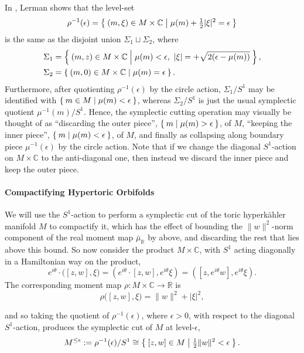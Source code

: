 \documentclass{amsart}
\newcommand{\ra}{\rightarrow}
\newcommand{\e}{\epsilon}
\newcommand{\RR}{\mathbb{R}}
\newcommand{\CC}{\mathbb{C}}
\begin{document}
	In \cite{Ler95}, Lerman shows that the level-set
	\[
		\rho^{-1}(\e) = \Set{(m, \xi) \in M \times \CC | \mu(m) + \tfrac{1}{2}|\xi|^{2} = \e}
	\]
	is the same as the disjoint union $\Sigma_{1} \sqcup \Sigma_{2}$, where
	\begin{align*}
		\Sigma_{1} &= \Set{(m,z) \in M \times \CC | \mu(m) < \e,\ |\xi| = + \sqrt{2(\e - \mu(m))} }, \\
		\Sigma_{2} &= \Set{(m,0) \in M \times \CC | \mu(m) = \e}.
	\end{align*}
	Furthermore, after quotienting $\rho^{-1}(\e)$ by the circle action, $\Sigma_{1}/S^{1}$ may be identified with $\Set{m \in M | \mu(m) < \e}$, whereas $\Sigma_{2}/S^{1}$ is just the usual symplectic quotient $\mu^{-1}(m)/S^{1}$. Hence, the symplectic cutting operation may visually be thought of as ``discarding the outer piece'', $\Set{m | \mu(m) > \e}$, of $M$, ``keeping the inner piece'', $\Set{ m | \mu(m) < \e}$, of $M$, and finally as collapsing along boundary piece $\mu^{-1}(\e)$ by the circle action. Note that if we change the diagonal $S^{1}$-action on $M \times \CC$ to the anti-diagonal one, then instead we discard the inner piece and keep the outer piece.
	
	
	
	\paragraph{Compactifying Hypertoric Orbifolds}
	
	We will use the $S^{1}$-action to perform a symplectic cut of the toric hyperk\"ahler manifold $M$ to compactify it, which has the effect of bounding the $\|w\|^{2}$-norm component of the real moment map $\bar{\mu}_{\RR}$ by above, and discarding the rest that lies above this bound. So now consider the product $M \times \CC$, with $S^{1}$ acting diagonally in a Hamiltonian way on the product,
	$$
	e^{i\theta} \cdot \big( [z,w], \xi   \big) = \left( e^{i\theta} \cdot [z,w], e^{i\theta}\xi\right) = \left( [z,e^{i\theta}w], e^{i\theta}\xi\right).
	$$
	The corresponding moment map $\rho : M \times \CC \ra \RR$ is
	\[
	\rho\big( [z,w], \xi  \big) = \|w\|^{2} + |\xi|^{2},
	\]
	
	and so taking the quotient of $\rho^{-1}(\e)$, where $\e > 0$, with respect to the diagonal $S^{1}$-action, produces the symplectic cut of $M$ at level-$\e$, 
	\begin{equation*}
		M^{\leq \e} := \rho^{-1}(\e)/S^{1} \cong \Set{[z,w] \in M | \tfrac{1}{2}\|w\|^{2} < \e}.
	\end{equation*}
	
\end{document}
